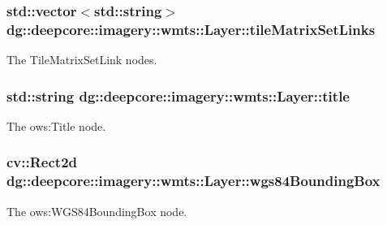 \subsubsection[{\texorpdfstring{tile\+Matrix\+Set\+Links}{tileMatrixSetLinks}}]{\setlength{\rightskip}{0pt plus 5cm}std\+::vector$<$std\+::string$>$ dg\+::deepcore\+::imagery\+::wmts\+::\+Layer\+::tile\+Matrix\+Set\+Links}\hypertarget{structdg_1_1deepcore_1_1imagery_1_1wmts_1_1_layer_a1b3f111751a740773df1ccb0039e587e}{}\label{structdg_1_1deepcore_1_1imagery_1_1wmts_1_1_layer_a1b3f111751a740773df1ccb0039e587e}


The Tile\+Matrix\+Set\+Link nodes. 

\subsubsection[{\texorpdfstring{title}{title}}]{\setlength{\rightskip}{0pt plus 5cm}std\+::string dg\+::deepcore\+::imagery\+::wmts\+::\+Layer\+::title}\hypertarget{structdg_1_1deepcore_1_1imagery_1_1wmts_1_1_layer_a31a9052e2ccbf947e87c236f94172ceb}{}\label{structdg_1_1deepcore_1_1imagery_1_1wmts_1_1_layer_a31a9052e2ccbf947e87c236f94172ceb}


The ows\+:Title node. 

\subsubsection[{\texorpdfstring{wgs84\+Bounding\+Box}{wgs84BoundingBox}}]{\setlength{\rightskip}{0pt plus 5cm}cv\+::\+Rect2d dg\+::deepcore\+::imagery\+::wmts\+::\+Layer\+::wgs84\+Bounding\+Box}\hypertarget{structdg_1_1deepcore_1_1imagery_1_1wmts_1_1_layer_aa5965fd52b8132c904f537024885ff88}{}\label{structdg_1_1deepcore_1_1imagery_1_1wmts_1_1_layer_aa5965fd52b8132c904f537024885ff88}


The ows\+:W\+G\+S84\+Bounding\+Box node. 

